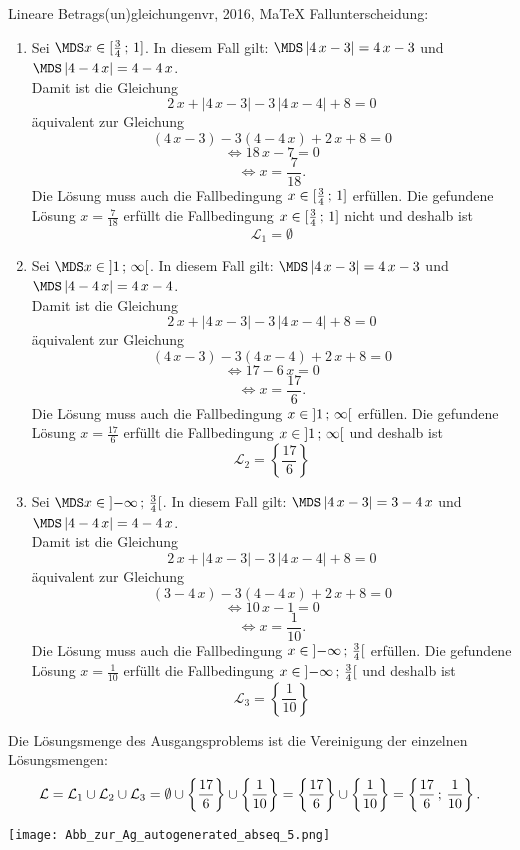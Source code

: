\begin{MAufgabe}{Lineare Betrags(un)gleichungen}{vr, 2016, MaTeX}
 Fallunterscheidung: 

 \begin{enumerate} 
 \item Sei $ \MDS x\in[ \frac{3}{4} \, \MIntvlSep \, 1]$. 
 In diesem Fall gilt: 
  $ \MDS \left| 4\, x - 3\right|=4\, x - 3$ und $ \MDS \left| 4 - 4\, x\right|=4 - 4\, x$. \\ 
 Damit ist die Gleichung 
 $$ 
2\, x + \left|4\, x - 3\right| - 3\, \left|4\, x - 4\right| + 8= 0
$$
 \"aquivalent zur Gleichung
 $$ 
\left(4\, x - 3\right)-3\left( 4 - 4\, x\right)+2\, x+8= 0 
$$  
$$ 
 \Leftrightarrow 18\, x - 7= 0 
$$  
$$ \Leftrightarrow x = \frac{7}{18} . 
 $$ 
 Die L\"osung muss auch die Fallbedingung $x\in [ \frac{3}{4} \, ; \, 1] $ erf\"ullen. Die gefundene L\"osung $x=\frac{7}{18}$ erf\"ullt die Fallbedingung  $x\in [ \frac{3}{4} \, ; \, 1]$ nicht und deshalb ist  $$
 \mathcal{L}_{1}=\emptyset 
 $$ 
\item Sei $ \MDS x\in\MoIl  1 \, \MIntvlSep \, \infty\MoIr $. 
 In diesem Fall gilt: 
  $ \MDS \left| 4\, x - 3\right|=4\, x - 3$ und $ \MDS \left| 4 - 4\, x\right|=4\, x - 4$. \\ 
 Damit ist die Gleichung 
 $$ 
2\, x + \left|4\, x - 3\right| - 3\, \left|4\, x - 4\right| + 8= 0
$$
 \"aquivalent zur Gleichung
 $$ 
\left(4\, x - 3\right)-3\left( 4\, x - 4\right)+2\, x+8= 0 
$$  
$$ 
 \Leftrightarrow 17 - 6\, x= 0 
$$  
$$ \Leftrightarrow x = \frac{17}{6} . 
 $$ 
 Die L\"osung muss auch die Fallbedingung $x\in \mbox{}]\mathopen{}  1 \, ; \, \infty[\mbox{}  $ erf\"ullen. Die gefundene L\"osung $x=\frac{17}{6}$ erf\"ullt die Fallbedingung  $x\in \mbox{}]\mathopen{}  1 \, ; \, \infty[\mbox{} $ und deshalb ist  $$
 \mathcal{L}_{2}=\left\{\frac{17}{6}\right\}
 $$ 
\item Sei $ \MDS x\in\MoIl  -\infty \, \MIntvlSep \, \frac{3}{4}\MoIr $. 
 In diesem Fall gilt: 
  $ \MDS \left| 4\, x - 3\right|=3 - 4\, x$ und $ \MDS \left| 4 - 4\, x\right|=4 - 4\, x$. \\ 
 Damit ist die Gleichung 
 $$ 
2\, x + \left|4\, x - 3\right| - 3\, \left|4\, x - 4\right| + 8= 0
$$
 \"aquivalent zur Gleichung
 $$ 
\left(3 - 4\, x\right)-3\left( 4 - 4\, x\right)+2\, x+8= 0 
$$  
$$ 
 \Leftrightarrow 10\, x - 1= 0 
$$  
$$ \Leftrightarrow x = \frac{1}{10} . 
 $$ 
 Die L\"osung muss auch die Fallbedingung $x\in \mbox{}]\mathopen{}  -\infty \, ; \, \frac{3}{4}[\mbox{}  $ erf\"ullen. Die gefundene L\"osung $x=\frac{1}{10}$ erf\"ullt die Fallbedingung  $x\in \mbox{}]\mathopen{}  -\infty \, ; \, \frac{3}{4}[\mbox{} $ und deshalb ist  $$
 \mathcal{L}_{3}=\left\{\frac{1}{10}\right\}
 $$ 
 \end{enumerate} 
  Die L\"osungsmenge des Ausgangsproblems ist die Vereinigung der einzelnen L\"osungsmengen: 
$$ \mathcal{L} = \mathcal{L}_{1} \cup \mathcal{L}_{2} \cup \mathcal{L}_{3} 
 = \emptyset\cup \left\{\frac{17}{6}\right\}\cup \left\{\frac{1}{10}\right\} 
  =\left\{\frac{17}{6}\right\}\cup\left\{\frac{1}{10}\right\} 
  = \left\{\frac{17}{6}\, ; \,\frac{1}{10}\right\} 
 . $$ 
 
 \begin{center}
 \texttt{[image: Abb\_zur\_Ag\_autogenerated\_abseq\_5.png]} \end{center}
 
\else\relax\fi
 \end{MAufgabe}